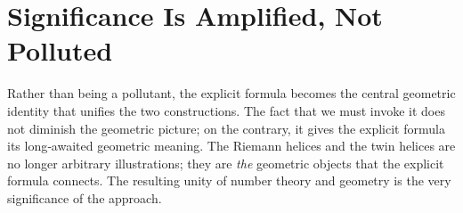 \documentclass[12pt,a4paper]{article}
\begin{document}
\section{Significance Is Amplified, Not Polluted}
Rather than being a pollutant, the explicit formula becomes the central geometric identity that unifies the two constructions.  The fact that we must invoke it does not diminish the geometric picture; on the contrary, it gives the explicit formula its long‑awaited geometric meaning.  The Riemann helices and the twin helices are no longer arbitrary illustrations; they are \emph{the} geometric objects that the explicit formula connects.  The resulting unity of number theory and geometry is the very significance of the approach.
\end{document}
